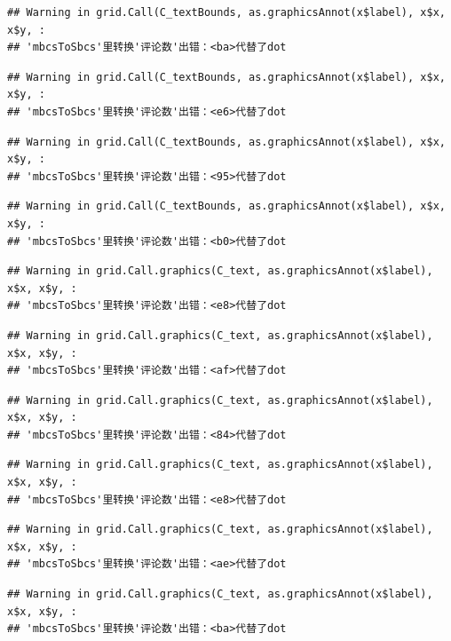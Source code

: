 \documentclass[
]{article}
\begin{document}
\begin{verbatim}
## Warning in grid.Call(C_textBounds, as.graphicsAnnot(x$label), x$x, x$y, :
## 'mbcsToSbcs'里转换'评论数'出错：<ba>代替了dot
\end{verbatim}

\begin{verbatim}
## Warning in grid.Call(C_textBounds, as.graphicsAnnot(x$label), x$x, x$y, :
## 'mbcsToSbcs'里转换'评论数'出错：<e6>代替了dot
\end{verbatim}

\begin{verbatim}
## Warning in grid.Call(C_textBounds, as.graphicsAnnot(x$label), x$x, x$y, :
## 'mbcsToSbcs'里转换'评论数'出错：<95>代替了dot
\end{verbatim}

\begin{verbatim}
## Warning in grid.Call(C_textBounds, as.graphicsAnnot(x$label), x$x, x$y, :
## 'mbcsToSbcs'里转换'评论数'出错：<b0>代替了dot
\end{verbatim}

\begin{verbatim}
## Warning in grid.Call.graphics(C_text, as.graphicsAnnot(x$label), x$x, x$y, :
## 'mbcsToSbcs'里转换'评论数'出错：<e8>代替了dot
\end{verbatim}

\begin{verbatim}
## Warning in grid.Call.graphics(C_text, as.graphicsAnnot(x$label), x$x, x$y, :
## 'mbcsToSbcs'里转换'评论数'出错：<af>代替了dot
\end{verbatim}

\begin{verbatim}
## Warning in grid.Call.graphics(C_text, as.graphicsAnnot(x$label), x$x, x$y, :
## 'mbcsToSbcs'里转换'评论数'出错：<84>代替了dot
\end{verbatim}

\begin{verbatim}
## Warning in grid.Call.graphics(C_text, as.graphicsAnnot(x$label), x$x, x$y, :
## 'mbcsToSbcs'里转换'评论数'出错：<e8>代替了dot
\end{verbatim}

\begin{verbatim}
## Warning in grid.Call.graphics(C_text, as.graphicsAnnot(x$label), x$x, x$y, :
## 'mbcsToSbcs'里转换'评论数'出错：<ae>代替了dot
\end{verbatim}

\begin{verbatim}
## Warning in grid.Call.graphics(C_text, as.graphicsAnnot(x$label), x$x, x$y, :
## 'mbcsToSbcs'里转换'评论数'出错：<ba>代替了dot
\end{verbatim}
\end{document}
